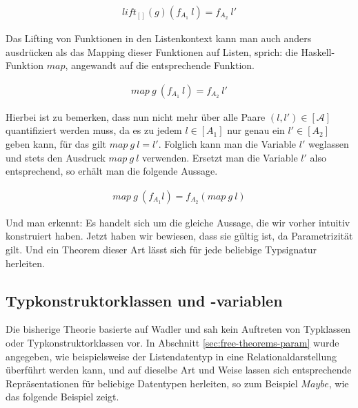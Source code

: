 \begin{align*}
lift_{[]}(g) (f_{A_1}\ l) = f_{A_2}\ l'
\end{align*}

Das Lifting von Funktionen in den Listenkontext kann man auch anders ausdrücken als das Mapping dieser Funktionen auf Listen, sprich:
die Haskell-Funktion $map$, angewandt auf die entsprechende Funktion.

\begin{align*}
map\ g\ (f_{A_1}\ l) = f_{A_2}\ l'
\end{align*}

Hierbei ist zu bemerken, dass nun nicht mehr über alle Paare $(l, l') \in [\mathcal{A}]$
quantifiziert werden muss, da es zu jedem $l \in [A_1]$ nur genau ein $l' \in [A_2]$ geben kann, für das gilt $map\ g\ l = l'$. Folglich kann man die Variable $l'$
weglassen und stets den Ausdruck $map\ g\ l$ verwenden.
Ersetzt man die Variable $l'$ also entsprechend, so erhält man die folgende Aussage.

\begin{align*}
map\ g\ (f_{A_1} l) = f_{A_2} (map\ g\ l)
\end{align*}

Und man erkennt: Es handelt sich um die gleiche Aussage, die wir vorher intuitiv konstruiert haben. Jetzt haben wir bewiesen,
dass sie gültig ist, da Parametrizität gilt. Und ein Theorem dieser Art lässt sich für jede beliebige Typsignatur herleiten.


\subsection{Typkonstruktorklassen und -variablen}

\label{sec:typkonstruktorklassen}

Die bisherige Theorie basierte auf Wadler \cite{wadler} und sah kein Auftreten von Typklassen oder Typkonstruktorklassen vor.
In Abschnitt \ref{sec:free-theorems-param} wurde angegeben, wie beispielsweise der Listendatentyp in eine Relationaldarstellung
überführt werden kann, und auf dieselbe Art und Weise lassen sich entsprechende Repräsentationen für beliebige Datentypen
herleiten, so zum Beispiel $Maybe$, wie das folgende Beispiel zeigt.

